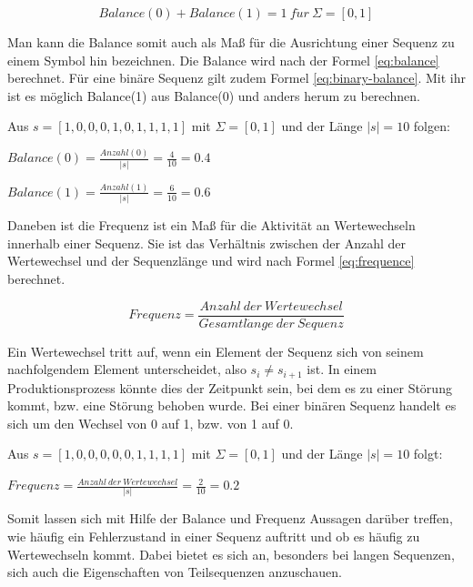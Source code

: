 \begin{equation}
\label{eq:binary-balance}
Balance(0) + Balance(1) = 1\ f\ddot{u}r\ \Sigma = [0,1]
\end{equation}

Man kann die Balance somit auch als Maß für die Ausrichtung einer Sequenz zu einem Symbol hin bezeichnen. Die Balance wird nach der Formel \ref{eq:balance} berechnet. Für eine binäre Sequenz gilt zudem Formel \ref{eq:binary-balance}. Mit ihr ist es möglich Balance(1) aus Balance(0) und anders herum zu berechnen.

\begin{theorem}
Aus $s = [1,0,0,0,1,0,1,1,1,1]$ mit $\Sigma = [0,1]$ und der Länge $|s| = 10$ folgen:

$
Balance(0) = \frac{Anzahl(0)}{|s|} = \frac{4}{10} = 0.4
$

$
Balance(1) = \frac{Anzahl(1)}{|s|} = \frac{6}{10} = 0.6
$
\end{theorem}

Daneben ist die Frequenz ist ein Maß für die Aktivität an Wertewechseln innerhalb einer Sequenz. Sie ist das Verhältnis zwischen der Anzahl der Wertewechsel und der Sequenzlänge und wird nach Formel \ref{eq:frequence} berechnet. 

\begin{equation}
\label{eq:frequence}
Frequenz = \frac{Anzahl\ der\ Wertewechsel}{Gesamtl\ddot{a}nge\ der\ Sequenz}
\end{equation}

Ein Wertewechsel tritt auf, wenn ein Element der Sequenz sich von seinem nachfolgendem Element unterscheidet, also $s_{i} \neq s_{i+1}$ ist. In einem Produktionsprozess könnte dies der Zeitpunkt sein, bei dem es zu einer Störung kommt, bzw. eine Störung behoben wurde. Bei einer binären Sequenz handelt es sich um den Wechsel von 0 auf 1, bzw. von 1 auf 0.

\begin{theorem}
Aus $s = [1,0,0,0,0,0,1,1,1,1]$ mit $\Sigma = [0,1]$ und der Länge $|s| = 10$ folgt:

$
Frequenz = \frac{Anzahl\ der\ Wertewechsel}{|s|} = \frac{2}{10} = 0.2
$
\end{theorem}

Somit lassen sich mit Hilfe der Balance und Frequenz Aussagen darüber treffen, wie häufig ein Fehlerzustand in einer Sequenz auftritt und ob es häufig zu Wertewechseln kommt. Dabei bietet es sich an, besonders bei langen Sequenzen, sich auch die Eigenschaften von Teilsequenzen anzuschauen.

